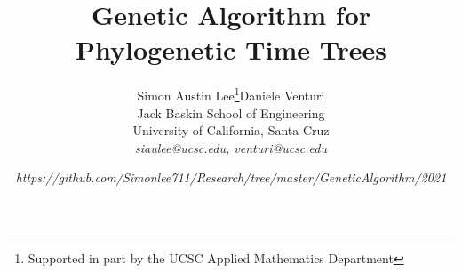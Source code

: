 \title{Genetic Algorithm for Phylogenetic Time Trees}

\author{ 
Simon Austin Lee\thanks{Supported in part by the UCSC Applied Mathematics Department}\hspace{.5cm}Daniele Venturi\hspace{.5cm}\\
Jack Baskin School of Engineering \\
University of California, Santa Cruz\\
\emph{siaulee@ucsc.edu, venturi@ucsc.edu}
}\date{\small\emph{https://github.com/Simonlee711/Research/tree/master/GeneticAlgorithm/2021}}
\maketitle 
